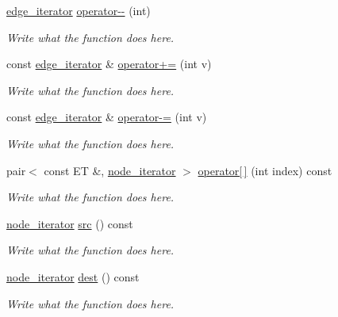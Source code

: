 \begin{DoxyCompactItemize}
\hyperlink{classedge__iterator}{edge\+\_\+iterator} \hyperlink{classedge__iterator_a3da59a9e235c99f0b701477086b99494}{operator-\/-\/} (int)
\begin{DoxyCompactList}\small\item\em Write what the function does here. \end{DoxyCompactList}\item 
const \hyperlink{classedge__iterator}{edge\+\_\+iterator} \& \hyperlink{classedge__iterator_a26db7ad0e725bfd38983e1450b877afe}{operator+=} (int v)
\begin{DoxyCompactList}\small\item\em Write what the function does here. \end{DoxyCompactList}\item 
const \hyperlink{classedge__iterator}{edge\+\_\+iterator} \& \hyperlink{classedge__iterator_a4829ee598220fe5609326bb83a8df437}{operator-\/=} (int v)
\begin{DoxyCompactList}\small\item\em Write what the function does here. \end{DoxyCompactList}\item 
pair$<$ const E\+T \&, \hyperlink{classnode__iterator}{node\+\_\+iterator} $>$ \hyperlink{classedge__iterator_a98bc0578ec9560fd3468d0757f6de6e0}{operator\mbox{[}$\,$\mbox{]}} (int index) const 
\begin{DoxyCompactList}\small\item\em Write what the function does here. \end{DoxyCompactList}\item 
\hyperlink{classnode__iterator}{node\+\_\+iterator} \hyperlink{classedge__iterator_a3a74b70f3ab83503cce8529a88a82207}{src} () const 
\begin{DoxyCompactList}\small\item\em Write what the function does here. \end{DoxyCompactList}\item 
\hyperlink{classnode__iterator}{node\+\_\+iterator} \hyperlink{classedge__iterator_a844d42a7c62e44df1034231bcf568ae4}{dest} () const 
\begin{DoxyCompactList}\small\item\em Write what the function does here. \end{DoxyCompactList}\end{DoxyCompactItemize}
